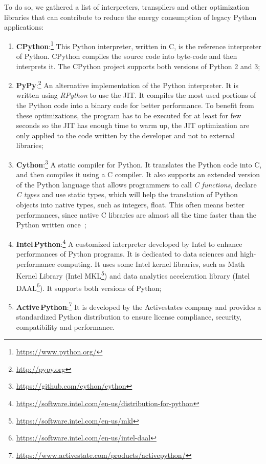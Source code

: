 To do so, we gathered a list of interpreters, transpilers and other optimization libraries that can contribute to reduce the energy consumption of legacy Python applications:
\begin{enumerate}
    \item \textbf{CPython}:\footnote{\url{https://www.python.org/}}
          This Python interpreter, written in C, is the reference interpreter of Python.
          CPython compiles the source code into byte-code and then interprets it.
          The CPython project supports both versions of Python 2 and 3;
    \item \textbf{PyPy}:\footnote{\url{http://pypy.org}}
          An alternative implementation of the Python interpreter.
          It is written using \emph{RPython} to use the JIT.
          It compiles the most used portions of the Python code into a binary code for better performance.
          To benefit from these optimizations, the program has to be executed for at least for few seconds so the JIT has enough time to warm up, the JIT optimization are only applied to the code written by the developer and not to external libraries;
    \item \textbf{Cython}:\footnote{\url{https://github.com/cython/cython}}
          A static compiler for Python.
          It translates the Python code into C, and then compiles it using a C compiler.
          It also supports an extended version of the Python language that allows programmers to call \emph{C functions}, declare \emph{C types} and use static types, which will help the translation of Python objects into native types, such as integers, float.
          This often means better performances, since native C libraries are almost all the time faster than the Python written once~\cite{pereira_energy_2017};
    \item \textbf{Intel\,Python}:\footnote{\url{https://software.intel.com/en-us/distribution-for-python}}
          A customized interpreter developed by Intel to enhance performances of Python programs.
          It is dedicated to data sciences and high-performance computing.
          It uses some Intel kernel libraries, such as Math Kernel Library (Intel MKL\footnote{\url{https://software.intel.com/en-us/mkl}}) and data analytics acceleration library (Intel DAAL\footnote{\url{https://software.intel.com/en-us/intel-daal}}).
          It supports both versions of Python;
    \item \textbf{Active\,Python}:\footnote{\url{https://www.activestate.com/products/activepython/}}
          It is developed by the Activestates company and provides a standardized Python distribution to ensure license compliance, security, compatibility and performance.

\end{enumerate}
